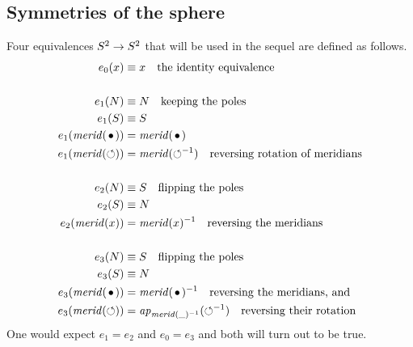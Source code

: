 \documentclass[english,a4]{article}
\begin{document}





\subsection{Symmetries of the sphere}
\label{sec:symmetries-sphere}

Four equivalences ${S^2}\to{S^2}$ that will be used in the sequel are
defined as follows. 
\begin{align}
  \label{eq:S2symmetries}
  e_0(x)&\jdeq x \quad\text{the identity equivalence}\\
\nonumber\\
  e_1(N)&\jdeq N \quad\text{keeping the poles}\\
  e_1(S)&\jdeq S\\
  e_1(\mrd(\base))&= \mrd(\base)\\
  e_1(\mrd(\Sloop))&= \mrd(\Sloop^{-1})\quad\text{reversing rotation of meridians}\\
\nonumber\\
  e_2(N)&\jdeq S \quad\text{flipping the poles}\\
  e_2(S)&\jdeq N\\
  e_2(\mrd(x))&= \mrd(x)^{-1}\quad\text{reversing the meridians}\\
\nonumber\\
  e_3(N)&\jdeq S \quad\text{flipping the poles}\\
  e_3(S)&\jdeq N\\
  e_3(\mrd(\base))&= \mrd(\base)^{-1}\quad\text{reversing the meridians, and}\\
  e_3(\mrd(\Sloop))&= \ap{\mrd(\_)^{-1}}(\Sloop^{-1})\quad\text{reversing their rotation}
\end{align}
One would expect $e_1=e_2$ and $e_0=e_3$ and both will turn out to be true.
\end{document}
